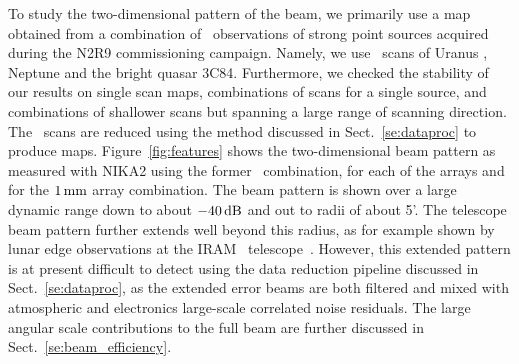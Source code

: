 To study the two-dimensional pattern of the beam, we 
primarily use a map obtained from a combination of \bm\ observations
of strong point sources acquired during the N2R9 commissioning campaign.
Namely, we use \bm\ scans of Uranus%
,  Neptune %
and the bright quasar 3C84. %
Furthermore, we checked the stability of our results on single scan
maps, combinations of scans for a single source, and combinations of
shallower scans but spanning a large range of scanning direction. {\lp
The \bm\ scans are reduced using the method discussed in
Sect.~\ref{se:dataproc} to produce maps.}
{\lp Figure~\ref{fig:features} shows the two-dimensional beam pattern
as measured with NIKA2 using the former \bm\ combination, for each of
the arrays and for the $1\,\rm{mm}$ array combination.}
{\lp The beam pattern is shown over a large dynamic range down
to about $-40\,\rm{dB}$ and out to radii of about 5’.
The telescope beam pattern further extends well beyond this radius, as for
example shown by lunar edge observations
at the IRAM \trentemetre\ telescope~\citep{Greve1998,
Kramer2013}. However,
this extended pattern is at present difficult to detect using the data
reduction pipeline discussed in Sect.~\ref{se:dataproc}, as
the extended error beams are both filtered and mixed with 
atmospheric and electronics large-scale correlated noise
residuals. The large angular scale contributions to the full beam are
further discussed in Sect.~\ref{se:beam_efficiency}.} 




